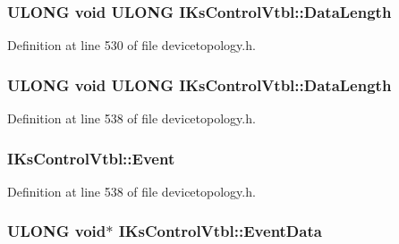\subsubsection[{\texorpdfstring{Data\+Length}{DataLength}}]{ {\bf U\+L\+O\+NG} {\bf void} {\bf U\+L\+O\+NG} I\+Ks\+Control\+Vtbl\+::\+Data\+Length}\hypertarget{struct_i_ks_control_vtbl_a00e367ebf0d70770e44e2ad3a3ab7492}{}\label{struct_i_ks_control_vtbl_a00e367ebf0d70770e44e2ad3a3ab7492}


Definition at line 530 of file devicetopology.\+h.

\subsubsection[{\texorpdfstring{Data\+Length}{DataLength}}]{ {\bf U\+L\+O\+NG} {\bf void} {\bf U\+L\+O\+NG} I\+Ks\+Control\+Vtbl\+::\+Data\+Length}\hypertarget{struct_i_ks_control_vtbl_a24d824073990edb3b0b012f5630b2738}{}\label{struct_i_ks_control_vtbl_a24d824073990edb3b0b012f5630b2738}


Definition at line 538 of file devicetopology.\+h.

\subsubsection[{\texorpdfstring{Event}{Event}}]{ I\+Ks\+Control\+Vtbl\+::\+Event}\hypertarget{struct_i_ks_control_vtbl_adec473dc47515b06d2132aeb83b7c59c}{}\label{struct_i_ks_control_vtbl_adec473dc47515b06d2132aeb83b7c59c}


Definition at line 538 of file devicetopology.\+h.

\subsubsection[{\texorpdfstring{Event\+Data}{EventData}}]{ {\bf U\+L\+O\+NG} {\bf void}$\ast$ I\+Ks\+Control\+Vtbl\+::\+Event\+Data}\hypertarget{struct_i_ks_control_vtbl_a188df34fe2048962375626822f9066ac}{}\label{struct_i_ks_control_vtbl_a188df34fe2048962375626822f9066ac}


